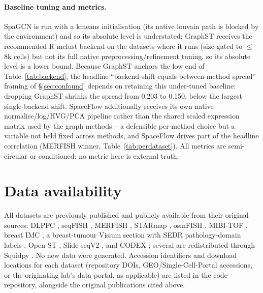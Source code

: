 \documentclass[journal]{IEEEtran}
\begin{document}
\paragraph{Baseline tuning and metrics.} SpaGCN is run with a kmeans initialisation (its native louvain
path is blocked by the environment) and so its absolute level is understated; GraphST receives the
recommended R mclust backend on the datasets where it runs (size-gated to $\leq$8k cells) but not its full
native preprocessing/refinement tuning, so its absolute level is a lower bound. Because GraphST anchors the
low end of Table~\ref{tab:backend}, the headline ``backend-shift equals between-method spread'' framing of
\S\ref{sec:confound} depends on retaining this under-tuned baseline: dropping GraphST shrinks the spread
from 0.203 to 0.150, below the largest single-backend shift. SpaceFlow additionally
receives its own native normalise/log/HVG/PCA pipeline rather than the shared scaled expression matrix used
by the graph methods -- a defensible per-method choice but a variable not held fixed across methods, and
SpaceFlow drives part of the headline correlation (MERFISH winner, Table~\ref{tab:perdataset}). All metrics are
semi-circular or conditioned: no metric here is external truth.

\section*{Data availability}
All datasets are previously published and publicly available from their original sources: DLPFC
\citep{maynard2021dlpfc}, seqFISH \citep{lohoff2022seqfish}, MERFISH \citep{moffitt2018merfish}, STARmap
\citep{wang2018starmap}, osmFISH \citep{codeluppi2018osmfish}, MIBI-TOF \citep{keren2018mibitof}, breast IMC
\citep{jackson2020imc}, a breast-tumour Visium section \citep{tenx2020brca} with SEDR pathology-domain labels
\citep{xu2024sedr}, Open-ST \citep{schott2024openst}, Slide-seqV2 \citep{stickels2021slideseq}, and
CODEX \citep{goltsev2018codex}; several are redistributed through Squidpy \citep{palla2022squidpy}. No new
data were generated. Accession identifiers and download locations for each dataset (repository DOIs,
GEO/Single-Cell-Portal accessions, or the originating lab's data portal, as applicable) are listed in the
code repository, alongside the original publications cited above.
\end{document}
